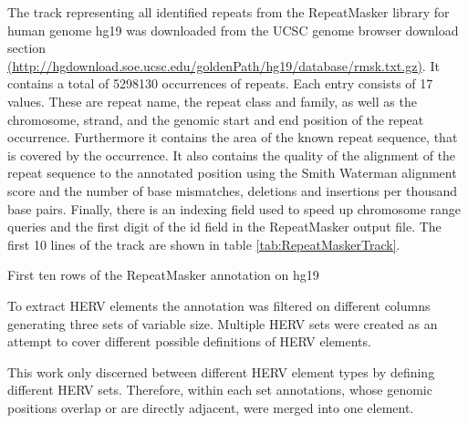 \documentclass[a4paper,12pt,twoside,openright]{article}
\begin{document}
The track representing all identified repeats from the RepeatMasker library for human genome hg19 was downloaded from the UCSC genome browser download section \url{(http://hgdownload.soe.ucsc.edu/goldenPath/hg19/database/rmsk.txt.gz)}. It contains a total of 5298130 occurrences of repeats. Each entry consists of 17 values. These are repeat name, the repeat class and family, as well as the chromosome, strand, and the genomic start and end position of the repeat occurrence. Furthermore it contains the area of the known repeat sequence, that is covered by the occurrence. It also contains the quality of the alignment of the repeat sequence to the annotated position using the Smith Waterman alignment score\cite{SMITH1981195} and the number of base mismatches, deletions and insertions per thousand base pairs. Finally, there is an indexing field used to speed up chromosome range queries and the first digit of the id field in the RepeatMasker output file. The first 10 lines of the track are shown in table \ref{tab:RepeatMaskerTrack}.

\begin{table}[b]
\centering
\label{tab:RepeatMaskerTrack}
\caption{First ten rows of the RepeatMasker annotation on hg19}
\end{table}

To extract HERV elements the annotation was filtered on different columns generating three sets of variable size. Multiple HERV sets were created as an attempt to cover different possible definitions of HERV elements.

This work only discerned between different HERV element types by defining different HERV sets. Therefore, within each set annotations, whose genomic positions overlap or are directly adjacent, were merged into one element.
\end{document}
